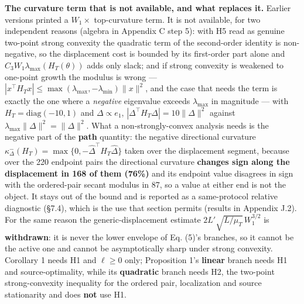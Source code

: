 \documentclass[pdflatex,sn-mathphys-ay]{sn-jnl}
\begin{document}
\textbf{The curvature term that is not available, and what replaces it.} Earlier versions printed a $W_1\times$ top-curvature term. It is not available, for two independent reasons (algebra in Appendix C step 5): with H5 read as genuine two-point strong convexity the quadratic term of the second-order identity is non-negative, so the displacement cost is bounded by its first-order part alone and $C_3W_1\lambda_{\max}(H_T(\theta))$ adds only slack; and if strong convexity is weakened to one-point growth the modulus is wrong --- $|x^\top H_Tx|\le\max(\lambda_{\max},-\lambda_{\min})\|x\|^2$, and the case that needs the term is exactly the one where a \emph{negative} eigenvalue exceeds $\lambda_{\max}$ in magnitude --- with $H_T=\mathrm{diag}(-10,1)$ and $\Delta\propto e_1$, $|\Delta^\top H_T\Delta|=10\|\Delta\|^2$ against $\lambda_{\max}\|\Delta\|^2=\|\Delta\|^2$. What a non-strongly-convex analysis needs is the negative part of the \textbf{path} quantity: the negative directional curvature $\kappa^-_\Delta(H_T)=\max\{0,-\widehat\Delta^\top H_T\widehat\Delta\}$ taken over the displacement segment, because over the 220 endpoint pairs the directional curvature \textbf{changes sign along the displacement in 168 of them (76\%)} and its endpoint value disagrees in sign with the ordered-pair secant modulus in 87, so a value at either end is not the object. It stays out of the bound and is reported as a same-protocol relative diagnostic (\S{}7.4), which is the use that section permits (results in Appendix J.2). For the same reason the generic-displacement estimate $2L'\sqrt{L/\mu_T}\,W_1^{3/2}$ is \textbf{withdrawn}: it is never the lower envelope of Eq. (5)'s branches, so it cannot be the active one and cannot be asymptotically sharp under strong convexity. Corollary 1 needs H1 and $\ell\ge0$ only; Proposition 1's \textbf{linear} branch needs H1 and source-optimality, while its \textbf{quadratic} branch needs H2, the two-point strong-convexity inequality for the ordered pair, localization and source stationarity and does \textbf{not} use H1.
\end{document}
